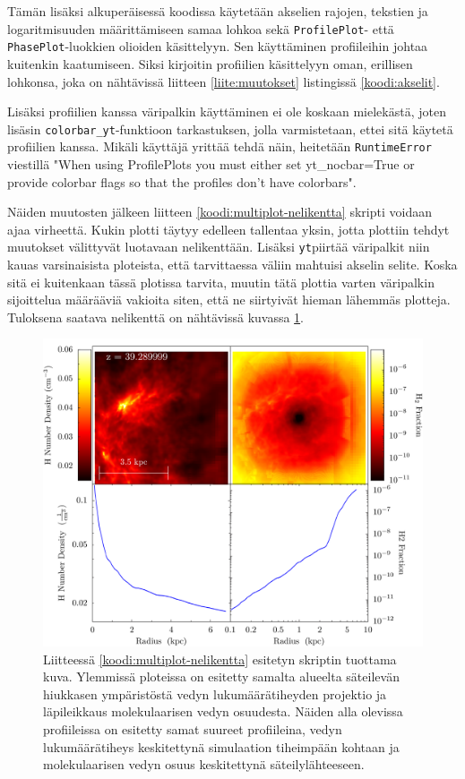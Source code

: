 \documentclass[12pt,a4paper]{article}
\newcommand{\yt}{\texttt{yt}}
\begin{document}
Tämän lisäksi alkuperäisessä koodissa käytetään akselien rajojen, tekstien ja logaritmisuuden määrittämiseen samaa lohkoa sekä \texttt{ProfilePlot}- että \texttt{PhasePlot}-luokkien olioiden käsittelyyn. Sen käyttäminen profiileihin johtaa kuitenkin kaatumiseen. Siksi kirjoitin profiilien käsittelyyn oman, erillisen lohkonsa, joka on nähtävissä liitteen \ref{liite:muutokset} listingissä \ref{koodi:akselit}.

Lisäksi profiilien kanssa väripalkin käyttäminen ei ole koskaan mielekästä, joten lisäsin \texttt{colorbar\_yt}-funktioon tarkastuksen, jolla varmistetaan, ettei sitä käytetä profiilien kanssa. Mikäli käyttäjä yrittää tehdä näin, heitetään \texttt{RuntimeError} viestillä "When using ProfilePlots you must either set yt\_nocbar=True or provide colorbar flags so that the profiles don't have colorbars".


Näiden muutosten jälkeen liitteen \ref{koodi:multiplot-nelikentta} skripti voidaan ajaa virheettä. Kukin plotti täytyy edelleen tallentaa yksin, jotta plottiin tehdyt muutokset välittyvät luotavaan nelikenttään. Lisäksi \yt piirtää väripalkit niin kauas varsinaisista ploteista, että tarvittaessa väliin mahtuisi akselin selite. Koska sitä ei kuitenkaan tässä plotissa tarvita, muutin tätä plottia varten väripalkin sijoittelua määrääviä vakioita siten, että ne siirtyivät hieman lähemmäs plotteja. Tuloksena saatava nelikenttä on nähtävissä kuvassa \ref{fig:nelikentta}.

\begin{figure}
   \centering
   \includegraphics[width=\textwidth]{../kuvat/nelikko.png}
   \caption{Liitteessä \ref{koodi:multiplot-nelikentta} esitetyn skriptin tuottama kuva. Ylemmissä ploteissa on esitetty samalta alueelta säteilevän hiukkasen ympäristöstä vedyn lukumäärätiheyden projektio ja läpileikkaus molekulaarisen vedyn osuudesta. Näiden alla olevissa profiileissa on esitetty samat suureet profiileina, vedyn lukumäärätiheys keskitettynä simulaation tiheimpään kohtaan ja molekulaarisen vedyn osuus keskitettynä säteilylähteeseen.} \label{fig:nelikentta}
\end{figure}
\end{document}
